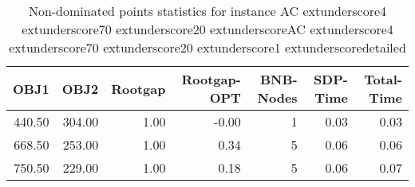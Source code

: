 \begin{table}
\caption{Non-dominated points statistics for instance AC	extunderscore4	extunderscore70	extunderscore20	extunderscoreAC	extunderscore4	extunderscore70	extunderscore20	extunderscore1	extunderscoredetailed}
\label{tab:stats/AC_4_70_20_AC_4_70_20_1_detailed}
\begin{tabular}{rrrrrrr}
\toprule
OBJ1 & OBJ2 & Rootgap & Rootgap-OPT & BNB-Nodes & SDP-Time & Total-Time \\
\midrule
440.50 & 304.00 & 1.00 & -0.00 & 1 & 0.03 & 0.03 \\
668.50 & 253.00 & 1.00 & 0.34 & 5 & 0.06 & 0.06 \\
750.50 & 229.00 & 1.00 & 0.18 & 5 & 0.06 & 0.07 \\
\bottomrule
\end{tabular}
\end{table}
